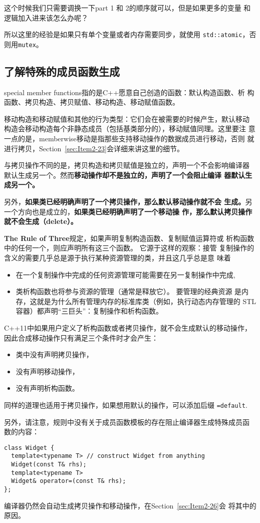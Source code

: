 这个时候我们只需要调换一下part 1 和 2的顺序就可以，但是如果更多的变量
和逻辑加入进来该怎么办呢？

所以这里的经验是如果只有单个变量或者内存需要同步，就使用
\texttt{std::atomic}，否则用\texttt{mutex}。

\subsection{了解特殊的成员函数生成}
\label{sec:Item2-17}

special member functions指的是C++愿意自己创造的函数：默认构造函数、析
构函数、拷贝构造、拷贝赋值、移动构造、移动赋值函数。

移动构造和移动赋值和其他的行为类型：它们会在被需要的时候产生，默认移动
构造会移动构造每个非静态成员（包括基类部分的），移动赋值同理。这里要注
意一点的是，memberwise移动是指那些支持移动操作的数据成员进行移动，否则
就进行拷贝，Section~\ref{sec:Item2-23}会详细来讲这里的细节。

与拷贝操作不同的是，拷贝构造和拷贝赋值是独立的，声明一个不会影响编译器
默认生成另一个。然而\textbf{移动操作却不是独立的，声明了一个会阻止编译
  器默认生成另一个。}

另外，\textbf{如果类已经明确声明了一个拷贝操作，那么默认移动操作就不会
生成。}另一个方向也是成立的，\textbf{如果类已经明确声明了一个移动操
作，那么默认拷贝操作就不会生成（delete）。}

\textbf{The Rule of Three}规定，如果声明复制构造函数、复制赋值运算符或
析构函数中的任何一个，则应声明所有这三个函数。 它源于这样的观察：接管
复制操作的含义的需要几乎总是源于执行某种资源管理的类，并且这几乎总是意
味着
\begin{itemize}
\item 在一个复制操作中完成的任何资源管理可能需要在另一复制操作中完成,
\item 类析构函数也将参与资源的管理（通常是释放它）。 要管理的经典资源
是内存，这就是为什么所有管理内存的标准库类（例如，执行动态内存管理的
STL 容器）都声明“三巨头”：复制操作和析构函数。  
\end{itemize}

C++11中如果用户定义了析构函数或者拷贝操作，就不会生成默认的移动操作，
因此合成移动操作只有满足三个条件时才会产生：
\begin{itemize}
\item 类中没有声明拷贝操作，
\item 没有声明移动操作，
\item 没有声明析构函数。
\end{itemize}
同样的道理也适用于拷贝操作，如果想用默认的操作，可以添加后缀
\texttt{=default}.

另外，请注意，规则中没有关于成员函数模板的存在阻止编译器生成特殊成员函
数的内容：
\begin{verbatim}
class Widget {
  template<typename T> // construct Widget from anything
  Widget(const T& rhs);
  template<typename T>
  Widget& operator=(const T& rhs);
};
\end{verbatim}
编译器仍然会自动生成拷贝操作和移动操作，在Section~\ref{sec:Item2-26}会
将其中的原因。 
